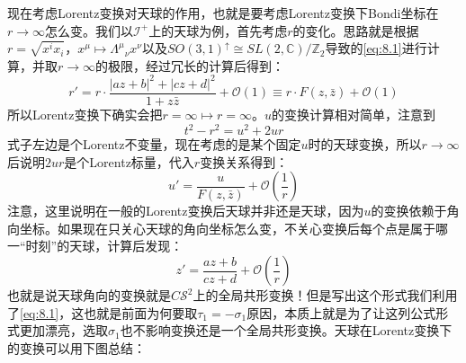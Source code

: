 现在考虑Lorentz变换对天球的作用，也就是要考虑Lorentz变换下Bondi坐标在$r\to\infty$怎么变。我们以$\mathcal{I}^+$上的天球为例，首先考虑$r$的变化。思路就是根据$r=\sqrt{x^ix_i}$，$x^\mu\mapsto{\Lambda^\mu}_{\nu}x^\nu$以及$SO(3,1)^\uparrow\cong SL(2,\mathbb{C})/\mathbb{Z}_2$导致的\ref{eq:8.1}进行计算，并取$r\to\infty$的极限，经过冗长的计算后得到：
\begin{equation}
	r'=r\cdot\frac{|az+b|^2+|cz+d|^2}{1+z\bar z}+\mathcal{O}(1)\equiv r\cdot F(z,\bar z)+\mathcal{O}(1)
\end{equation}
所以Lorentz变换下确实会把$r=\infty\mapsto r=\infty$。$u$的变换计算相对简单，注意到
\[t^2-r^2=u^2+2ur\]
式子左边是个Lorentz不变量，现在考虑的是某个固定$u$时的天球变换，所以$r\to\infty$后说明$2ur$是个Lorentz标量，代入$r$变换关系得到：
\begin{equation}
	u'=\frac{u}{F(z,\bar z)}+\mathcal{O}\left(\frac{1}{r}\right)
\end{equation}
注意，这里说明在一般的Lorentz变换后天球并非还是天球，因为$u$的变换依赖于角向坐标。如果现在只关心天球的角向坐标怎么变，不关心变换后每个点是属于哪一“时刻”的天球，计算后发现：
\begin{equation}
	z'=\frac{az+b}{cz+d}+\mathcal{O}\left(\frac{1}{r}\right)
\end{equation}
也就是说天球角向的变换就是$C\mathcal{S}^2$上的全局共形变换！但是写出这个形式我们利用了\ref{eq:8.1}，这也就是前面为何要取$\tau_1=-\sigma_1$原因，本质上就是为了让这列公式形式更加漂亮，选取$\sigma_1$也不影响变换还是一个全局共形变换。天球在Lorentz变换下的变换可以用下图总结：
